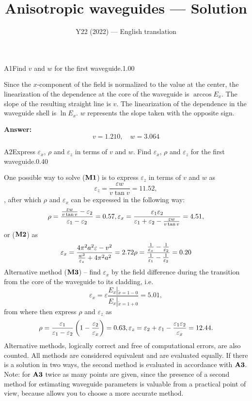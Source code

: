 \documentclass[11pt,a4paper]{article}
\title{\textbf{Anisotropic waveguides --- Solution}}
\author{\normalsize Y22 (2022) — English translation}
\date{}
\begin{document}
\maketitle\vspace{-0.5em}
\begin{solcard}{A1}{Find $v$ and $w$ for the first waveguide.}{1.00}

Since the $x$-component of the field is normalized to the value at the center, the linearization of the dependence at the core of the waveguide is $\arccos E_x$. The slope of the resulting straight line is $v$. The linearization of the dependence in the waveguide shell is $\ln E_x$. $w$ represents the slope taken with the opposite sign.

\par\smallskip\noindent\textbf{Answer:} \[v=1.210,\quad w=3.064\]
\end{solcard}

\begin{solcard}{A2}{Express $\varepsilon_x$, $\rho$ and $\varepsilon_z$ in terms of $v$ and $w$. Find $\varepsilon_x$, $\rho$ and $\varepsilon_z$ for the first waveguide.}{0.40}

One possible way to solve ($\bf M1$) is to express $\varepsilon_z$ in terms of $v$ and $w$ as \[\varepsilon_z=\frac{\varepsilon w}{v\tan v}=11.52,\], after which $\rho$ and $\varepsilon_x$ can be expressed in the following way: \[\rho=\frac{\frac{\varepsilon w}{v\tan v}-\varepsilon_2}{\varepsilon_1-\varepsilon_2}=0.57,\\\varepsilon_x=\frac{\varepsilon_1\varepsilon_2}{\varepsilon_1+\varepsilon_2-\frac{\varepsilon w}{v\tan v}}=4.51,\]or ($\bf M2$) as \[\varepsilon_x=\frac{4\pi^2a^2\varepsilon-v^2}{\frac{w^2}{\varepsilon_z}+4\pi^2a^2}=2.72\\\rho=\frac{\frac1{\varepsilon_x}-\frac1{\varepsilon_2}}{\frac1{\varepsilon_1}-\frac1{\varepsilon_2}}=0.20\] Alternative method ($\bf M3$) – find $\varepsilon_x$ by the field difference during the transition from the core of the waveguide to its cladding, i.e. \[\varepsilon_x=\varepsilon\frac{E_x\left\vert_{\tilde x=1-0}\right.}{E_x\left\vert_{\tilde x=1+0}\right.}=5.01,\] from where then express $\rho$ and $\varepsilon_z$ as\[\rho=\frac{\varepsilon_1}{\varepsilon_1-\varepsilon_2}\left(1-\frac{\varepsilon_2}{\varepsilon_x}\right)=0.63,\\\varepsilon_z=\varepsilon_2+\varepsilon_1-\frac{\varepsilon_1\varepsilon_2}{\varepsilon_x}=12.44.\] Alternative methods, logically correct and free of computational errors, are also counted. All methods are considered equivalent and are evaluated equally. If there is a solution in two ways, the second method is evaluated in accordance with $\bf A3$. Note: for $\bf A3$ twice as many points are given, since the presence of a second method for estimating waveguide parameters is valuable from a practical point of view, because allows you to choose a more accurate method.

\end{solcard}
\end{document}
